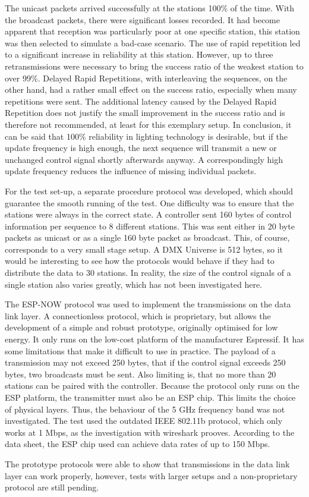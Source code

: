 The unicast packets arrived successfully at the stations 100\% of the time.
With the broadcast packets, there were significant losses recorded.
It had become apparent that reception was particularly poor at one specific station,
this station was then selected to simulate a bad-case scenario.
The use of rapid repetition led to a significant increase in reliability at this station.
However, up to three retransmissions were necessary to bring the success ratio of the weakest station to over 99\%.
Delayed Rapid Repetitions, with interleaving the sequences, on the other hand, 
had a rather small effect on the success ratio,
especially when many repetitions were sent.
The additional latency caused by the Delayed Rapid Repetition
does not justify the small improvement in the success ratio and is therefore not recommended,
at least for this exemplary setup.
In conclusion, it can be said that 100\% reliability in lighting technology is desirable,
but if the update frequency is high enough,
the next sequence will transmit a new or unchanged control signal shortly afterwards anyway.
A correspondingly high update frequency reduces the influence of missing individual packets.

For the test set-up, a separate procedure protocol was developed,
which should guarantee the smooth running of the test.
One difficulty was to ensure that the stations were always in the correct state.
A controller sent 160 bytes of control information per sequence to 8 different stations.
This was sent either in 20 byte packets as unicast or as a single 160 byte packet as broadcast.
This, of course, corresponds to a very small stage setup.
A DMX Universe is 512 bytes, so it would be interesting to see
how the protocols would behave if they had to distribute the data to 30 stations.
In reality, the size of the control signals of a single station also varies greatly,
which has not been investigated here.

The ESP-NOW protocol was used to implement the transmissions on the data link layer.
A connectionless protocol, which is proprietary, but allows the development of a simple and robust prototype,
originally optimised for low energy.
It only runs on the low-cost platform of the manufacturer Espressif.
It has some limitations that make it difficult to use in practice.
The payload of a transmission may not exceed 250 bytes, 
that if the control signal exceeds 250 bytes, two broadcasts must be sent.
Also limiting is, that no more than 20 stations can be paired with the controller.
Because the protocol only runs on the ESP platform, the transmitter must also be an ESP chip.
This limits the choice of physical layers.
Thus, the behaviour of the 5 GHz frequency band was not investigated.
The test used the outdated IEEE 802.11b protocol, which only works at 1 Mbps,
as the investigation with wireshark prooves.
According to the data sheet, the ESP chip used can achieve data rates of up to 150 Mbps.

The prototype protocols were able to show that transmissions in the data link layer can work properly,
however, tests with larger setups and a non-proprietary protocol are still pending.
